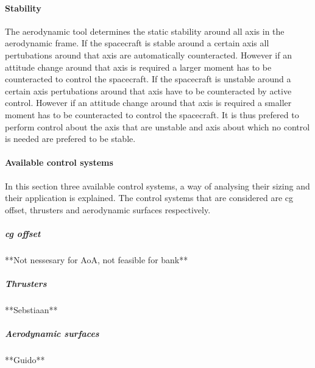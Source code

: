 \paragraph{Stability}
\label{control:stab}
The aerodynamic tool determines the static stability around all axis in the aerodynamic frame. If the spacecraft is stable around a certain axis all pertubations around that axis are automatically counteracted. However if an attitude change around that axis is required a larger moment has to be counteracted to control the spacecraft.  If the spacecraft is unstable around a certain axis pertubations around that axis have to be counteracted by active control. However if an attitude change around that axis is required a smaller moment has to be counteracted to control the spacecraft. It is thus prefered to perform control about the axis that are unstable and axis about which no control is needed are prefered to be stable.

\paragraph{Available control systems}
\label{control:system}
In this section three available control systems, a way of analysing their sizing and their application is explained. The control systems that are considered are \gls{cg} offset, thrusters and aerodynamic surfaces respectively.

\subparagraph{\acrfull{cg} offset}

**Not nessesary for AoA, not feasible for bank**

\subparagraph{Thrusters}

**Sebstiaan**

\subparagraph{Aerodynamic surfaces}

**Guido**



